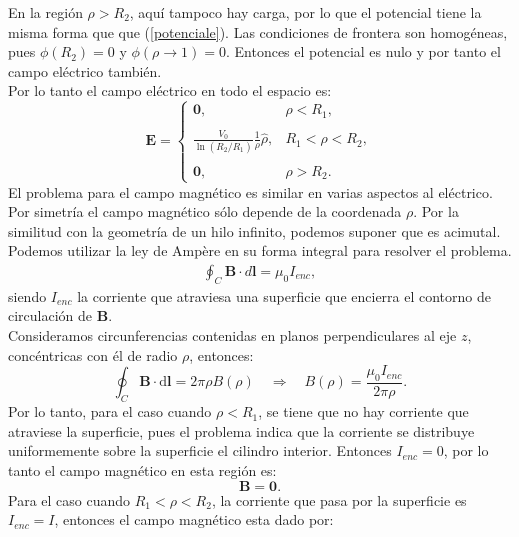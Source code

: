 \documentclass[11pt,fleqn]{book} %
\begin{document}
\begin{example}
\begin{equation}
\end{equation}
En la regi\'on $\rho > R_{2}$, aqu\'i tampoco hay carga, por lo que el potencial tiene la misma forma que que (\ref{potenciale}). Las condiciones de frontera son homog\'eneas, pues $\phi(R_{2})=0$ y $\phi(\rho\to1)=0.$
Entonces el potencial es nulo y por tanto el campo el\'ectrico tambi\'en.\\
Por lo tanto el campo el\'ectrico en todo el espacio es:
\begin{equation}
\mathbf{E}=\begin{cases} \textbf{0}, & \rho<R_{1},\\ & \\ \displaystyle\frac{V_0}{\ln(R_{2}/R_{1})}\frac{1}{\rho}\hat{\rho}, &R_{1}<\rho<R_2, \\ & \\ \textbf{0}, & \rho>R_{2}.\end{cases}  \label{E en espacio}
\end{equation}
El problema para el campo magn\'etico es similar en varias aspectos al el\'ectrico. Por simetr\'ia el campo magn\'etico s\'olo depende de la coordenada $\rho$. Por la similitud con la geometr\'ia de un hilo infinito, podemos suponer que es acimutal. Podemos utilizar la ley de Ampère en su forma integral para resolver el problema.
\begin{eqnarray*}
\oint_C \textbf{B}  \cdot d \textbf{l}=\mu_{0} I_{enc},
\end{eqnarray*}
siendo $I_{enc}$ la corriente que atraviesa una superficie que encierra el contorno de circulaci\'on de $\textbf{B}$.\\
Consideramos circunferencias contenidas en planos perpendiculares al eje $z$, conc\'entricas con \'el de radio $\rho$, entonces:
\begin{equation}
 \oint_C\mathbf{B}\cdot \mathrm{d}\textbf{l} = 2\pi\rho B(\rho) \quad\Rightarrow\quad B(\rho) = \frac{\mu_0 I_{enc}}{2\pi\rho}.
\end{equation}
Por lo tanto, para el caso cuando $\rho<R_{1}$, se tiene que no hay corriente que atraviese la superficie, pues el problema indica que la corriente se distribuye uniformemente sobre la superficie el cilindro interior. Entonces $I_{enc}=0$, por lo tanto el campo magn\'etico en esta regi\'on es:
\begin{equation}
 \textbf{B}=\textbf{0}.  \label{B}
\end{equation}
Para el caso cuando $R_{1}<\rho<R_{2}$, la corriente que pasa por la superficie es $I_{enc}=I$, entonces el campo magn\'etico esta dado por:

\end{example}
\end{document}
